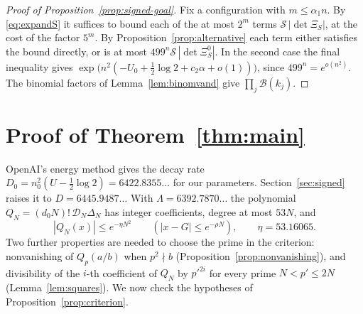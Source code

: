 \documentclass[11pt]{amsart}
\newcommand{\EtaTot}{53.16065}
\newcommand{\Decay}{6445.9487}
\newcommand{\DecayOA}{6422.8355}
\newcommand{\LamDen}{6392.7870}
\theoremstyle{definition}
\theoremstyle{remark}
\numberwithin{equation}{section}
\newcommand{\cD}{\mathcal D}
\begin{document}
\begin{proof}[Proof of Proposition~\ref{prop:signed-goal}]
Fix a configuration with $m\le\alpha_1n$. By \eqref{eq:expandS} it suffices to bound each of the at most $2^m$ terms
$\mathcal S\,|\det\Xi_S|$, at the cost of the factor $5^m$. By Proposition~\ref{prop:alternative} each term either satisfies the
bound directly, or is at most $499^n\mathcal S\,|\det\Xi^0_S|$. In the second case the final inequality gives
$\exp\bigl(n^2(-U_0+\frac12\log2+c_2\alpha+o(1))\bigr)$, since $499^n=e^{o(n^2)}$. The binomial factors of
Lemma~\ref{lem:binomvand} give $\prod_j\mathcal B(k_j)$.
\end{proof}
\section{Proof of Theorem~\ref{thm:main}}\label{sec:proof}

OpenAI's energy method gives the decay rate $D_0=n_0^2(U-\frac12\log2)=\DecayOA\ldots$ for our parameters.
Section~\ref{sec:signed} raises it to $D=\Decay\ldots$ With $\Lambda=\LamDen\ldots$ the polynomial
$Q_N=(d_0N)!\,\cD_N\Delta_N$ has integer coefficients, degree at most $53N$, and
\[
 |Q_N(x)|\le e^{-\eta N^2}\qquad(|x-G|\le e^{-\rho N}),\qquad \eta=\EtaTot .
\]
Two further properties are needed to choose the prime in the criterion: nonvanishing of $Q_p(a/b)$ when
$p^2\nmid b$ (Proposition~\ref{prop:nonvanishing}), and divisibility of the $i$-th coefficient of $Q_N$ by
$p'^{2i}$ for every prime $N<p'\le2N$ (Lemma~\ref{lem:squares}). We now check the hypotheses of
Proposition~\ref{prop:criterion}.
\end{document}
